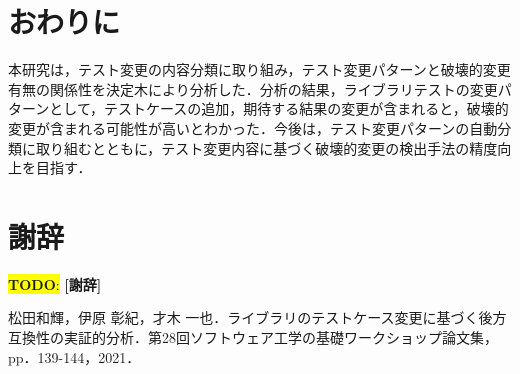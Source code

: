\documentclass[uplatex,dvipdfmx,a4paper,twocolumn,base=11pt,jbase=11pt,ja=standard]{bxjsarticle}  %
\newcommand{\todo}[1]{\colorbox{yellow}{{\bf TODO}:}{\color{red} {\textbf{[#1]}}}}
\begin{document}



\begin{table*}[t]
  \caption{ライブラリテスト変更パターンの分類}
  \label{table_test_patern}
  \centering

\end{table*}


\section{おわりに}

本研究は，テスト変更の内容分類に取り組み，テスト変更パターンと破壊的変更有無の関係性を決定木により分析した．分析の結果，ライブラリテストの変更パターンとして，テストケースの追加，期待する結果の変更が含まれると，破壊的変更が含まれる可能性が高いとわかった．今後は，テスト変更パターンの自動分類に取り組むとともに，テスト変更内容に基づく破壊的変更の検出手法の精度向上を目指す．

\section*{謝辞}

\todo{謝辞}

\begin{thebibliography}{10}
   松田和輝，伊原 彰紀，才木 一也．ライブラリのテストケース変更に基づく後方互換性の実証的分析．第28回ソフトウェア工学の基礎ワークショップ論文集，pp．139-144，2021．
\end{thebibliography}
\end{document}
